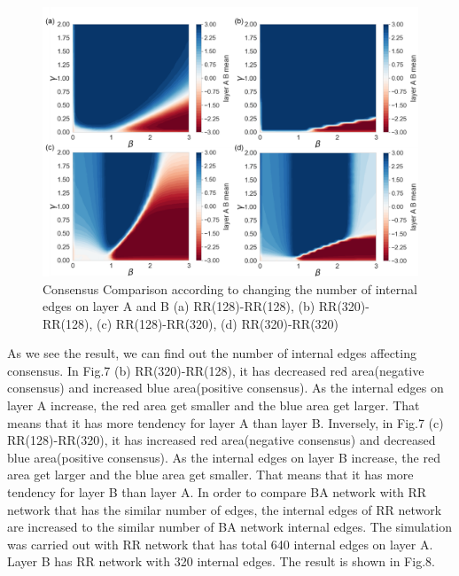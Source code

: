 \documentclass[english]{cccconf}
\begin{document}
\begin{figure}[!htb]
  \centering
  \includegraphics[width=\hsize]{FIG7.png}
  \caption{Consensus Comparison according to changing the number of internal edges on layer A and B (a) RR(128)-RR(128), (b) RR(320)-RR(128), (c) RR(128)-RR(320), (d) RR(320)-RR(320)}
  \label{Fig7}
\end{figure}
As we see the result, we can find out the number of internal edges affecting consensus. In Fig.7 (b) RR(320)-RR(128), it has decreased red area(negative consensus) and increased blue area(positive consensus). As the internal edges on layer A increase, the red area get smaller and the blue area get larger. That means that it has more tendency for layer A than layer B. 
Inversely, in Fig.7 (c) RR(128)-RR(320), it has increased red area(negative consensus) and decreased blue area(positive consensus). As the internal edges on layer B increase, the red area get larger and the blue area get smaller. That means that it has more tendency for layer B than layer A.
In order to compare BA network with RR network that has the similar number of edges, the internal edges of RR network are increased to the similar number of BA network internal edges. The simulation was carried out with RR network that has total 640 internal edges on layer A. Layer B has RR network with 320 internal edges. The result is shown in Fig.8.
\end{document}
